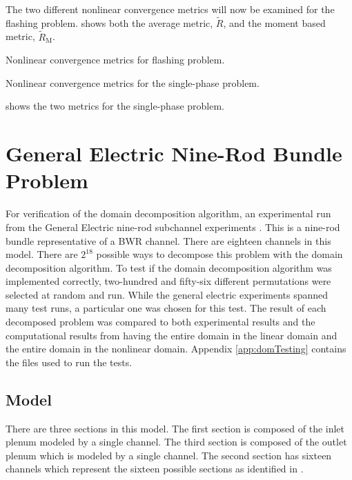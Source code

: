 The two different nonlinear convergence metrics will now be examined for the flashing problem.
 shows both the average metric, $\tilde{R}$, and the moment based metric, $\tilde{R}_{\text{M}}$.

\begin{table}[h!t]
\centering

\caption{Nonlinear convergence metrics for flashing problem.}
\label{tab:flashing_criteria}
\end{table}

\begin{table}[h!t]
\centering

\caption{Nonlinear convergence metrics for the single-phase problem.}
\label{tab:single_criteria}
\end{table}

 shows the two metrics for the single-phase problem.

\section{General Electric Nine-Rod Bundle Problem}
\label{sect:ge_mixing}
For verification of the domain decomposition algorithm, an experimental run from the General Electric nine-rod subchannel experiments \cite{Lahey1970}.
This is a nine-rod bundle representative of a BWR channel.
There are eighteen channels in this model.
There are $2^{18}$ possible ways to decompose this problem with the domain decomposition algorithm.
To test if the domain decomposition algorithm was implemented correctly, two-hundred and fifty-six different permutations were selected at random and run.
While the general electric experiments spanned many test runs, a particular one was chosen for this test.
The result of each decomposed problem was compared to both experimental results and the computational results from having the entire domain in the linear domain and the entire domain in the nonlinear domain.
Appendix \ref{app:domTesting} contains the files used to run the tests.


\subsection{Model}
\label{subsect:ge_model}

There are three sections in this model.
The first section is composed of the inlet plenum modeled by a single channel.
The third section is composed of the outlet plenum which is modeled by a single channel.
The second section has sixteen channels which represent the sixteen possible sections as identified in .

